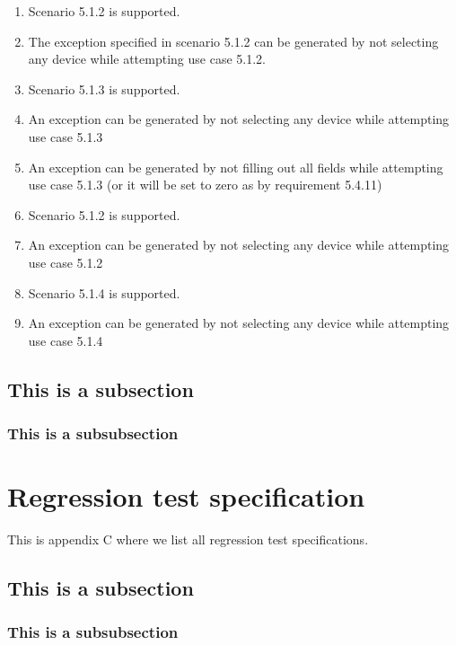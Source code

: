 \documentclass[a4paper]{article}
\begin{document}
\begin{appendices}
\begin{enumerate}[label=\bfseries Test \thesubsection.\arabic*,labelwidth=\widthof{\text{Test 10.10.10}},leftmargin=!]
	\item Scenario 5.1.2 is supported.
	\item The exception specified in scenario 5.1.2 can be generated by not selecting any device while attempting use case 5.1.2.
	
	\item Scenario 5.1.3 is supported.
	\item An exception can be generated by not selecting any device while attempting use case 5.1.3
	\item An exception can be generated by not filling out all fields while attempting use case 5.1.3 (or it will be set to zero as by requirement 5.4.11)
	
	\item Scenario 5.1.2 is supported.
	\item An exception can be generated by not selecting any device while attempting use case 5.1.2
	
	\item Scenario 5.1.4 is supported.
	\item An exception can be generated by not selecting any device while attempting use case 5.1.4
	 
\end{enumerate}

\subsection{This is a subsection}

\subsubsection{This is a subsubsection}

\newpage

\section{Regression test specification}
This is appendix C where we list all regression test specifications.

\subsection{This is a subsection}

\subsubsection{This is a subsubsection}
\end{appendices}
\end{document}
